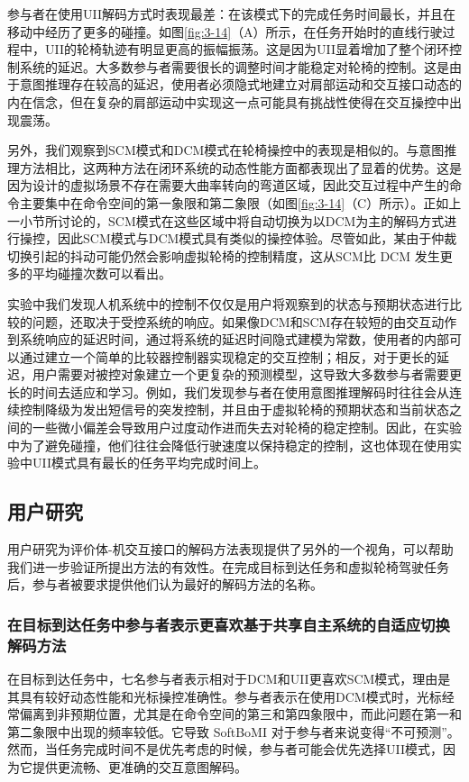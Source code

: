 参与者在使用UII解码方式时表现最差：在该模式下的完成任务时间最长，并且在移动中经历了更多的碰撞。如图\ref{fig:3-14}（A）所示，在任务开始时的直线行驶过程中，UII的轮椅轨迹有明显更高的振幅振荡。这是因为UII显着增加了整个闭环控制系统的延迟。大多数参与者需要很长的调整时间才能稳定对轮椅的控制。这是由于意图推理存在较高的延迟，使用者必须隐式地建立对肩部运动和交互接口动态的内在信念，但在复杂的肩部运动中实现这一点可能具有挑战性使得在交互操控中出现震荡。  

另外，我们观察到SCM模式和DCM模式在轮椅操控中的表现是相似的。与意图推理方法相比，这两种方法在闭环系统的动态性能方面都表现出了显着的优势。这是因为设计的虚拟场景不存在需要大曲率转向的弯道区域，因此交互过程中产生的命令主要集中在命令空间的第一象限和第二象限（如图\ref{fig:3-14}（C）所示）。正如上一小节所讨论的，SCM模式在这些区域中将自动切换为以DCM为主的解码方式进行操控，因此SCM模式与DCM模式具有类似的操控体验。尽管如此，某由于仲裁切换引起的抖动可能仍然会影响虚拟轮椅的控制精度，这从SCM比 DCM 发生更多的平均碰撞次数可以看出。  

实验中我们发现人机系统中的控制不仅仅是用户将观察到的状态与预期状态进行比较的问题，还取决于受控系统的响应。如果像DCM和SCM存在较短的由交互动作到系统响应的延迟时间，通过将系统的延迟时间隐式建模为常数，使用者的内部可以通过建立一个简单的比较器控制器实现稳定的交互控制；相反，对于更长的延迟，用户需要对被控对象建立一个更复杂的预测模型，这导致大多数参与者需要更长的时间去适应和学习。例如，我们发现参与者在使用意图推理解码时往往会从连续控制降级为发出短信号的突发控制，并且由于虚拟轮椅的预期状态和当前状态之间的一些微小偏差会导致用户过度动作进而失去对轮椅的稳定控制。因此，在实验中为了避免碰撞，他们往往会降低行驶速度以保持稳定的控制，这也体现在使用实验中UII模式具有最长的任务平均完成时间上。

\subsection{用户研究}用户研究为评价体-机交互接口的解码方法表现提供了另外的一个视角，可以帮助我们进一步验证所提出方法的有效性。在完成目标到达任务和虚拟轮椅驾驶任务后，参与者被要求提供他们认为最好的解码方法的名称。  

\subsubsection{在目标到达任务中参与者表示更喜欢基于共享自主系统的自适应切换解码方法}在目标到达任务中，七名参与者表示相对于DCM和UII更喜欢SCM模式，理由是其具有较好动态性能和光标操控准确性。参与者表示在使用DCM模式时，光标经常偏离到非预期位置，尤其是在命令空间的第三和第四象限中，而此问题在第一和第二象限中出现的频率较低。它导致 SoftBoMI 对于参与者来说变得``不可预测''。然而，当任务完成时间不是优先考虑的时候，参与者可能会优先选择UII模式，因为它提供更流畅、更准确的交互意图解码。  

